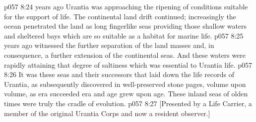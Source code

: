 \vs p057 8:24 \pc {} years ago Urantia was approaching the ripening of conditions suitable for the support of life. The continental land drift continued; increasingly the ocean penetrated the land as long fingerlike seas providing those shallow waters and sheltered bays which are so suitable as a habitat for marine life.
\vs p057 8:25 \pc {} years ago witnessed the further separation of the land masses and, in consequence, a further extension of the continental seas. And these waters were rapidly attaining that degree of saltiness which was essential to Urantia life.
\vs p057 8:26 It was these seas and their successors that laid down the life records of Urantia, as subsequently discovered in well\hyp{}preserved stone pages, volume upon volume, as era succeeded era and age grew upon age. These inland seas of olden times were truly the cradle of evolution.
\vsetoff
\vs p057 8:27 [Presented by a Life Carrier, a member of the original Urantia Corps and now a resident observer.]
\quizlink
